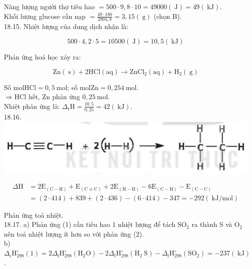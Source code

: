 \documentclass[10pt]{article}
\begin{document}
Năng lượng người thợ tiêu hao $=500 \cdot 9,8 \cdot 10=49000(\mathrm{~J})=49(\mathrm{~kJ})$.\\
Khối lượng glucose cần nạp $=\frac{49 \cdot 180}{2804,8}=3,15(\mathrm{~g})$ (chọn B).\\
18.15. Nhiệt lượng của dung dịch nhận là:

$$
500 \cdot 4,2 \cdot 5=10500(\mathrm{~J})=10,5(\mathrm{~kJ})
$$

Phản ứng hoá học xảy ra:

$$
\mathrm{Zn}(\mathrm{~s})+2 \mathrm{HCl}(\mathrm{aq}) \rightarrow \mathrm{ZnCl}_{2}(\mathrm{aq})+\mathrm{H}_{2}(\mathrm{~g})
$$

Số $\mathrm{mol} \mathrm{HCl}=0,5 \mathrm{~mol}$; số $\mathrm{mol} \mathrm{Zn}=0,254 \mathrm{~mol}$.\\
$\Rightarrow \mathrm{HCl}$ hết, Zn phản ứng $0,25 \mathrm{~mol}$.\\
Nhiệt phản ứng là: $\Delta_{\mathrm{r}} \mathrm{H}=\frac{10,5}{0,25}=42(\mathrm{~kJ})$.\\
18.16.\\
\includegraphics[max width=\textwidth, center]{2025_10_23_ee735750217b2aca435cg-41}

$$
\begin{aligned}
\Delta \mathrm{H} & =2 \mathrm{E}_{(\mathrm{C}-\mathrm{H})}+\mathrm{E}_{(\mathrm{C} \equiv \mathrm{C})}+2 \mathrm{E}_{(\mathrm{H}-\mathrm{H})}-6 \mathrm{E}_{(\mathrm{C}-\mathrm{H})}-\mathrm{E}_{(\mathrm{C}-\mathrm{C})} \\
& =(2 \cdot 414)+839+(2 \cdot 436)-(6 \cdot 414)-347=-292(\mathrm{~kJ} / \mathrm{mol})
\end{aligned}
$$

Phản ứng toả nhiệt.\\
18.17. a) Phản ứng (1) cần tiêu hao 1 nhiệt lượng để tách $\mathrm{SO}_{2}$ ra thành S và $\mathrm{O}_{2}$ nên toả nhiệt lượng ít hơn so với phản ứng (2).\\
b) $\Delta_{\mathrm{r}} \mathrm{H}_{298}^{\circ}(1)=2 \Delta_{\mathrm{f}} \mathrm{H}_{298}^{\circ}\left(\mathrm{H}_{2} \mathrm{O}\right)-2 \Delta_{\mathrm{f}} \mathrm{H}_{298}^{\circ}\left(\mathrm{H}_{2} \mathrm{~S}\right)-\Delta_{\mathrm{f}} \mathrm{H}_{298}^{\circ}\left(\mathrm{SO}_{2}\right)=-237(\mathrm{~kJ})$.
\end{document}

